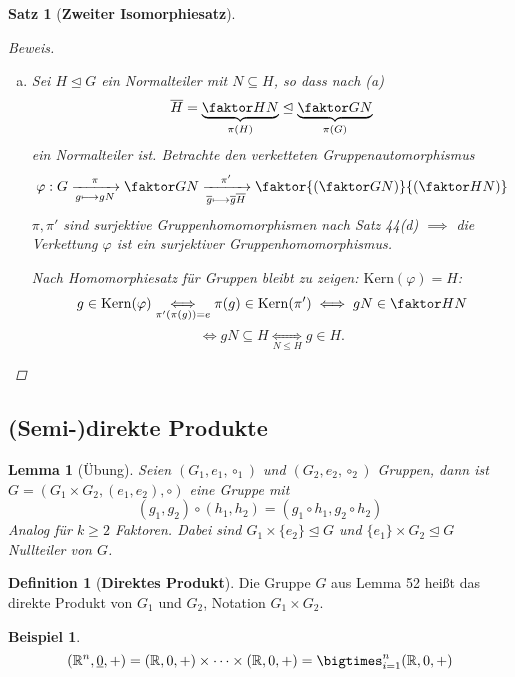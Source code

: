 \documentclass[a4paper]{article}
\theoremstyle{plain}
\newtheorem{lemm}[thm]{Lemma}
\newtheorem{satz}[thm]{Satz}
\theoremstyle{definition}
\newtheorem{defi}[thm]{Definition}
\newtheorem*{bsp*}{Beispiel}
\begin{document}
\begin{satz}[\textbf{Zweiter Isomorphiesatz}]
\begin{proof}[Beweis]
\begin{enumerate}[(a)]
\begin{itemize}
  \item Schließlich: Sei $H \in X$, zu zeigen ist $H \trianglelefteq G \iff \pi(H) \trianglelefteq \faktor GN$
        $$H \trianglelefteq G \iff \forall g \in G : gHg^{-1} \subseteq H$$
        $$\underset{\pi: G \to \overline G \text{ surj.}}\implies \forall \overline g \in \faktor GN: \overline g \pi(H)\overline g \subseteq \pi(H) \implies \pi(H) \trianglelefteq \overline G$$
        Umgekehrt: Falls $\pi(H) \trianglelefteq \trianglelefteq \overline G$ und $g \in G$:
        $$\pi(gHg^{-1}) = \overline g\pi(H)\overline g^{-1} \le \pi(H)$$
        $$\implies gHg^{-1} \subseteq \pi^{-1}(\pi(gHg^{-1})) \subseteq \pi^{-1}(\pi(H)) \underset{\nu \circ \psi = \mathrm{id}_{X}} = H$$
\end{itemize}
    \item Sei $H \trianglelefteq G$ ein Normalteiler mit $N \subseteq H$, so dass nach (a)
          $$\overline H = \underbrace{\faktor HN}_{\pi(H)} \trianglelefteq \underbrace{\faktor GN}_{\pi(G)}$$
          ein Normalteiler ist. Betrachte den verketteten Gruppenautomorphismus
          $$\varphi : G \xrightarrow[g \longmapsto gN]{\pi}\faktor GN \xrightarrow[\overline g \longmapsto \overline g \overline H]{\pi'} \faktor{\left(\faktor GN\right)}{\left(\faktor HN\right)}$$
          $\pi, \pi'$ sind surjektive Gruppenhomomorphismen nach Satz 44(d) $\implies$ die Verkettung $\varphi$ ist ein surjektiver Gruppenhomomorphismus.

          Nach Homomorphiesatz für Gruppen bleibt zu zeigen: $\mathrm{Kern}(\varphi) = H$:
          $$g \in \mathrm{Kern}(\varphi) \underset{\pi'(\pi(g))=e}\iff\pi(g) \in \mathrm{Kern}(\pi') \iff gN \in \faktor HN$$
          $$\iff gN \subseteq H \underset{N \le H}\iff g \in H.$$
  \end{enumerate}
\end{proof}
\end{satz}

\subsection*{(Semi-)direkte Produkte}%
\label{sec:Direkte Produkte}
\begin{lemm}[Übung]
  Seien $(G_{1}, e_{1}, \circ_{1})$ und $(G_{2}, e_{2}, \circ_{2})$ Gruppen, dann ist $G = (G_{1} \times G_{2}, (e_{1}, e_{2}), \circ)$ eine Gruppe mit
  $$(g_{1}, g_{2}) \circ (h_{1}, h_{2}) = (g_{1} \circ h_{1}, g_{2} \circ h_{2})$$
  Analog für $k \ge 2$ Faktoren. Dabei sind $G_{1} \times \{e_{2}\} \trianglelefteq G$ und $\{e_{1}\} \times G_{2} \trianglelefteq G$ Nullteiler von $G$.
\end{lemm}
\begin{defi}[\textbf{Direktes Produkt}] Die Gruppe $G$ aus Lemma 52 heißt das direkte Produkt von $G_{1}$ und $G_{2}$, Notation $G_{1} \times G_{2}$.
\end{defi}
\begin{bsp*}
$$(\Bbb R^{n}, \underline 0, +) = (\Bbb R, 0, +) \times \cdots \times (\Bbb R, 0, +) = \bigtimes_{i = 1}^{n}(\Bbb R, 0, +)$$
\end{bsp*}
\end{document}
